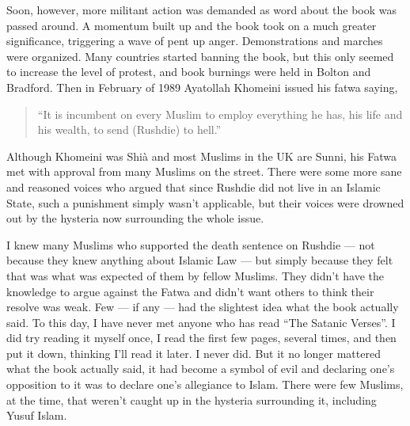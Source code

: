 \documentclass[12pt]{memoir}
\begin{document}
Soon, however, more militant action was demanded
as word about the book was passed around.
A momentum built up and the book took on a much greater significance,
triggering a wave of pent up anger.
Demonstrations and marches were organized.
Many countries started banning the book,
but this only seemed to increase the level of protest,
and book burnings were held in Bolton and Bradford.
Then in February of 1989 Ayatollah Khomeini issued his fatwa saying,

\begin{quote}
“It is incumbent on every Muslim to employ everything he has,
his life and his wealth, to send (Rushdie) to hell.”
\end{quote}

Although Khomeini was Shi\`a and most Muslims in the UK are Sunni,
his Fatwa met with approval from many Muslims on the street.
There were some more sane and reasoned voices
who argued that since Rushdie did not live in an Islamic State,
such a punishment simply wasn’t applicable,
but their voices were drowned out
by the hysteria now surrounding the whole issue.

I knew many Muslims who supported the death sentence on Rushdie —
not because they knew anything about Islamic Law —
but simply because they felt that was
what was expected of them by fellow Muslims.
They didn’t have the knowledge to argue against the Fatwa
and didn’t want others to think their resolve was weak.
Few — if any — had the slightest idea what the book actually said.
To this day, I have never met anyone who has read “The Satanic Verses”.
I did try reading it myself once, I read the first few pages,
several times, and then put it down, thinking I’ll read it later.
I never did.
But it no longer mattered what the book actually said,
it had become a symbol of evil and declaring one’s opposition to it
was to declare one’s allegiance to Islam.
There were few Muslims, at the time,
that weren’t caught up in the hysteria surrounding it, including Yusuf Islam.
\end{document}
